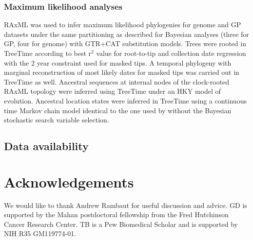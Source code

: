 \documentclass[11pt,oneside,letterpaper]{article}
\begin{document}
\subsubsection*{Maximum likelihood analyses}
RAxML \citep{stamatakis_raxml_2014} was used to infer maximum likelihood phylogenies for genome and GP datasets under the same partitioning as described for Bayesian analyses (three for GP, four for genome) with GTR+CAT substitution models.
Trees were rooted in TreeTime according to best r$^{2}$ value for root-to-tip and collection date regression with the 2 year constraint used for masked tips.
A temporal phylogeny with marginal reconstruction of most likely dates for masked tips was carried out in TreeTime \citep{sagulenko_treetime:_2018} as well.
Ancestral sequences at internal nodes of the clock-rooted RAxML topology were inferred using TreeTime under an HKY model \citep{hky_1985} of evolution.
Ancestral location states were inferred in TreeTime using a continuous time Markov chain model identical to the one used by \cite{lemey_bayesian_2009} without the Bayesian stochastic search variable selection.


\subsection*{Data availability}

\section*{Acknowledgements}
We would like to thank Andrew Rambaut for useful discussion and advice.
GD is supported by the Mahan postdoctoral fellowship from the Fred Hutchinson Cancer Research Center.
TB is a Pew Biomedical Scholar and is supported by NIH R35 GM119774-01.




\newpage

\setcounter{figure}{0}
\setcounter{table}{0}
\renewcommand{\thefigure}{S\arabic{figure}}
\renewcommand{\thetable}{S\arabic{table}}
\end{document}
